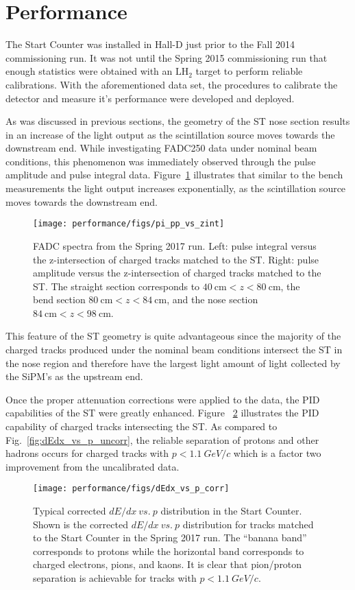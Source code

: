 \section{Performance} \label{sec:perform}

The Start Counter was installed in Hall-D just prior to the Fall 2014 \gx{} commissioning run.  It was not until the Spring 2015 commissioning run that enough statistics were obtained with an $\mathrm{LH_{2}}$ target to perform reliable calibrations.  With the aforementioned data set, the procedures to calibrate the detector and measure it's performance were developed and deployed.

As was discussed in previous sections, the geometry of the ST nose section results in an increase of the light output as the scintillation source moves towards the downstream end.  While investigating FADC250 data under nominal beam conditions, this phenomenon was immediately observed through the pulse amplitude and pulse integral data. Figure~\ref{fig:pippvszint} illustrates that similar to the bench measurements the light output increases exponentially, as the scintillation source moves towards the downstream end.
	\begin{figure}[!htb]
		\centering
		\texttt{[image: performance/figs/pi\_pp\_vs\_zint]}
		\caption{FADC spectra from the Spring 2017 run. Left: pulse integral versus the z-intersection of charged tracks matched to the ST. Right: pulse amplitude versus the z-intersection of charged tracks matched to the ST. The straight section corresponds to $40\ \mathrm{cm} < z < 80\ \mathrm{cm}$, the bend section $80\ \mathrm{cm} < z < 84\ \mathrm{cm}$, and the nose section $84\ \mathrm{cm} < z < 98\ \mathrm{cm}$.}
		\label{fig:pippvszint}
	\end{figure}
This feature of the ST geometry is quite advantageous since the majority of the charged tracks produced under the nominal \gx{} beam conditions intersect the ST in the nose region and therefore have the largest light amount of light collected by the SiPM's as the upstream end.

Once the proper attenuation corrections were applied to the data, the PID capabilities of the ST were greatly enhanced.  Figure ~\ref{fig:dEdx_vs_p_corr} illustrates the PID capability of charged tracks intersecting the ST.  As compared to Fig.~\ref{fig:dEdx_vs_p_uncorr}, the reliable separation of protons and other hadrons occurs for charged tracks with $p < 1.1\ GeV/c$ which is a factor two improvement from the uncalibrated data.
	\begin{figure}[!htb]
		\centering
		\texttt{[image: performance/figs/dEdx\_vs\_p\_corr]}
		\caption{Typical corrected $dE/dx\ vs.\ p$ distribution in the Start Counter.  Shown is the corrected $dE/dx\ vs.\ p$ distribution for tracks matched to the Start Counter in the Spring 2017 run. The ``banana band'' corresponds to protons while the horizontal band corresponds to charged electrons, pions, and kaons.  It is clear that pion/proton separation is achievable for tracks with $p < 1.1\ GeV/c$.}
		\label{fig:dEdx_vs_p_corr}
	\end{figure}  

